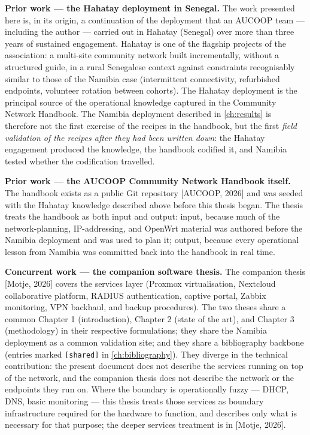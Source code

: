 \textbf{Prior work --- the Hahatay deployment in Senegal.} The work
presented here is, in its origin, a continuation of the deployment that
an AUCOOP team --- including the author --- carried out in Hahatay
(Senegal) over more than three years of sustained engagement. Hahatay is
one of the flagship projects of the association: a multi-site community
network built incrementally, without a structured guide, in a rural
Senegalese context against constraints recognisably similar to those of
the Namibia case (intermittent connectivity, refurbished endpoints,
volunteer rotation between cohorts). The Hahatay deployment is the
principal source of the operational knowledge captured in the Community
Network Handbook. The Namibia deployment described in
\autoref{ch:results} is therefore not the first exercise of the recipes
in the handbook, but the first \emph{field validation of the recipes
after they had been written down}: the Hahatay engagement produced the
knowledge, the handbook codified it, and Namibia tested whether the
codification travelled.

\textbf{Prior work --- the AUCOOP Community Network Handbook itself.}
The handbook exists as a public Git repository {[}AUCOOP, 2026{]} and
was seeded with the Hahatay knowledge described above before this thesis
began. The thesis treats the handbook as both input and output: input,
because much of the network-planning, IP-addressing, and OpenWrt
material was authored before the Namibia deployment and was used to plan
it; output, because every operational lesson from Namibia was committed
back into the handbook in real time.

\textbf{Concurrent work --- the companion software thesis.} The
companion thesis {[}Motje, 2026{]} covers the services layer (Proxmox
virtualisation, Nextcloud collaborative platform, RADIUS authentication,
captive portal, Zabbix monitoring, VPN backhaul, and backup procedures).
The two theses share a common Chapter 1 (introduction), Chapter 2 (state
of the art), and Chapter 3 (methodology) in their respective
formulations; they share the Namibia deployment as a common validation
site; and they share a bibliography backbone (entries marked
\texttt{{[}shared{]}} in \autoref{ch:bibliography}). They diverge in the
technical contribution: the present document does not describe the
services running on top of the network, and the companion thesis does
not describe the network or the endpoints they run on. Where the
boundary is operationally fuzzy --- DHCP, DNS, basic monitoring --- this
thesis treats those services as boundary infrastructure required for the
hardware to function, and describes only what is necessary for that
purpose; the deeper services treatment is in {[}Motje, 2026{]}.

